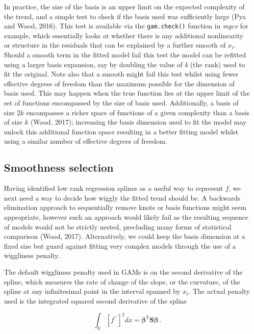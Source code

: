 \documentclass[12pt,]{article}
\begin{document}
In practice, the size of the basis is an upper limit on the expected
complexity of the trend, and a simple test to check if the basis used
was sufficiently large (Pya and Wood, 2016). This test is available via
the \texttt{gam.check()} function in \emph{mgcv} for example, which
essentially looks at whether there is any additional nonlinearity or
structure in the residuals that can be explained by a further smooth of
\(x_t\). Should a smooth term in the fitted model fail this test the
model can be refitted using a larger basis expansion, say by doubling
the value of \emph{k} (the rank) used to fit the original. Note also
that a smooth might fail this test whilst using fewer effective degrees
of freedom than the maximum possible for the dimension of basis used.
This may happen when the true function lies at the upper limit of the
set of functions encompassed by the size of basis used. Additionally, a
basis of size \(2k\) encompasses a richer space of functions of a given
complexity than a basis of size \(k\) (Wood, 2017); increasing the basis
dimension used to fit the model may unlock this additional function
space resulting in a better fitting model whilst using a similar number
of effective degrees of freedom.

\subsection{Smoothness selection}\label{smoothness-selection}

Having identified low rank regression splines as a useful way to
represent \(f\), we next need a way to decide how wiggly the fitted
trend should be. A backwards elimination approach to sequentially remove
knots or basis functions might seem appropriate, however such an
approach would likely fail as the resulting sequence of models would not
be strictly nested, precluding many forms of statistical comparison
(Wood, 2017). Alternatively, we could keep the basis dimension at a
fixed size but guard against fitting very complex models through the use
of a wiggliness penalty.

The default wiggliness penalty used in GAMs is on the second derivative
of the spline, which measures the rate of change of the slope, or the
curvature, of the spline at any infinitesimal point in the interval
spanned by \(x_t\). The actual penalty used is the integrated squared
second derivative of the spline

\begin{equation} \label{eq:quadratic-penalty}
\int_{\mathbb{R}} [f^{\prime\prime}]^2 dx = \boldsymbol{\beta}^{\mathsf{T}}\mathbf{S}\boldsymbol{\beta}\, .
\end{equation}
\end{document}
